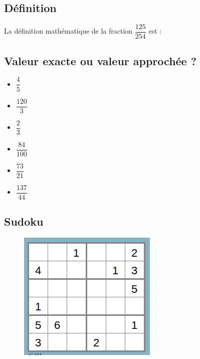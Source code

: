 \subsection*{Définition}
La définition mathématique de la fraction $\dfrac{125}{254}$ est : \dotfill \\ \Pointilles[2]

\begin{multicols}{2}

\subsection*{Valeur exacte ou valeur approchée ?}
\begin{itemize}[label={$\bullet$}]
  \item $\dfrac{4}{5}$ \dotfill \\
  \item $\dfrac{120}{3}$ \dotfill \\
  \item $\dfrac{2}{3}$ \dotfill \\
  \item $\dfrac{84}{100}$ \dotfill \\
  \item $\dfrac{73}{21}$ \dotfill \\
  \item $\dfrac{137}{44}$ \dotfill \\
\end{itemize}  \columnbreak 


\subsection*{Sudoku}
\begin{figure}[H]
  \centering
  \includegraphics[width=0.8\linewidth]{6x5-fractions/sudoku-6a.png}
\end{figure}

\end{multicols}

